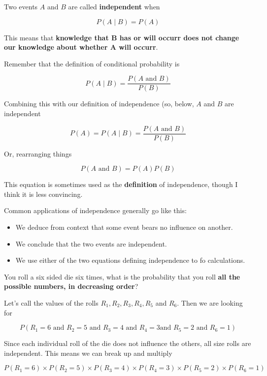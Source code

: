\begin{frame}

Two events $A$ and $B$ are called \textbf{independent} when

$$ P(A \mid B) = P(A) $$

This means that \textbf{knowledge that B has or will occurr does not change our
knowledge about whether A will occurr}.

\end{frame}
%

%
\begin{frame}

Remember that the definition of conditional probability is

$$ P(A \mid B) = \frac{P(A \text{ and } B)}{P(B)} $$

Combining this with our definition of independence (so, below, $A$ and $B$ are
independent

$$ P(A) = P(A \mid B) = \frac{P(A \text{ and } B)}{P(B)} $$

Or, rearranging things

$$ P(A \text{ and } B) = P(A) P(B) $$

This equation is sometimes used as the \textbf{definition} of independence,
though I think it is less convincing.

\end{frame}
%

%
\begin{frame}

Common applications of independence generally go like this:

\begin{itemize}
\item We deduce from context that some event bears no influence on another.
\item We conclude that the two events are independent.
\item We use either of the two equations defining independence to fo
calculations.
\end{itemize}

\end{frame}
%

%
\begin{frame}

You roll a six sided die six times, what is the probability that you roll
\textbf{all
the possible numbers, in decreasing order}?

\end{frame}
%

%
\begin{frame}

Let's call the values of the rolls $R_1, R_2, R_3, R_4, R_5$ and $R_6$.  Then we
are looking for

$$P(R_1 = 6 \text{ and } R_2 = 5 \text{ and } R_3 = 4\text{ and } R_4 = 3 \text{
and } R_5 = 2 \text{ and } R_6 = 1)$$

Since each individual roll of the die does not influence the others, all size
rolls are independent.  This means we can break up and multiply

$$ P(R_1 = 6) \times P(R_2 = 5) \times P(R_3 = 4) \times P(R_4 = 3) \times P(R_5
= 2) \times P(R_6 = 1) $$

\end{frame}
%

